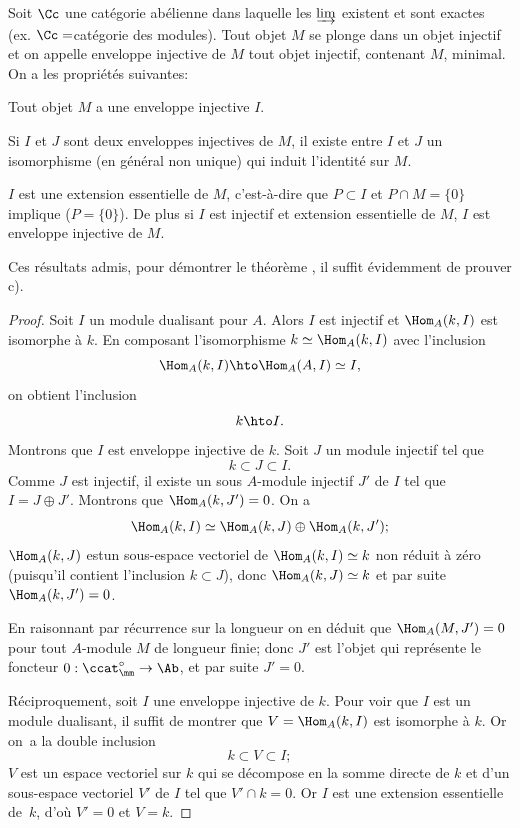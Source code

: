 Soit $\Cc$ une cat\'egorie ab\'elienne dans laquelle les $\varinjlim$ existent et sont exactes (ex. $\Cc=$cat\'egorie des modules). Tout objet $M$ se plonge dans un objet injectif et on appelle enveloppe injective de $M$ tout objet injectif, contenant $M$, minimal. On a les propri\'et\'es suivantes:
\begin{enumeratei}
\item
Tout objet $M$ a une enveloppe injective $I$.
\item
Si $I$ et $J$ sont deux enveloppes injectives de $M$, il existe entre $I$ et $J$ un isomorphisme (en g\'en\'eral non unique) qui induit l'identit\'e sur $M$.
\item
$I$ est une extension essentielle\label{pIV.13} de $M$, c'est-\`a-dire que $P\subset I$ et $P\cap M=\{ 0\}$ implique ($P=\{ 0\}$). De plus si $I$ est injectif et extension essentielle de $M$, $I$ est enveloppe injective de $M$.
\end{enumeratei}

Ces r\'esultats admis, pour d\'emontrer le th\'eor\`eme , il suffit \'evidemment de prouver c).

\begin{proof}
Soit $I$ un module dualisant pour $A$. Alors $I$ est injectif et $\Hom_{A}(k, I)$ est isomorphe \`a $k$. En composant l'isomorphisme $k\simeq \Hom_{A}(k, I)$ avec l'inclusion
$$
\Hom_{A}(k, I)\hto \Hom_{A}(A, I)\simeq I,
$$
on obtient l'inclusion
$$
k\hto I.
$$
Montrons que $I$ est enveloppe injective de $k$. Soit $J$ un module injectif tel que
$$
k\subset J\subset I.
$$
Comme $J$ est injectif, il existe un sous $A$-module injectif $J'$ de $I$ tel que $I=J\oplus J'$. Montrons que $\Hom_{A}(k, J')=0$. On a
$$
\Hom_{A}(k, I)\simeq \Hom_{A}(k, J)\oplus \Hom_{A}(k, J');
$$
$\Hom_{A}(k, J)$ est\pageoriginale un sous-espace vectoriel de $\Hom_{A}(k, I)\simeq k$ non r\'eduit \`a z\'ero (puisqu'il contient l'inclusion $k\subset J$), donc $\Hom_{A}(k, J)\simeq k$ et par suite $\Hom_{A}(k, J')=0$.

En raisonnant par r\'ecurrence sur la longueur on en d\'eduit que $\Hom_{A}(M, J')=0$ pour tout $A$-module $M$ de longueur finie; donc $J'$ est l'objet qui repr\'esente le foncteur $0:\ccat_{\mm}^{\circ}\to \Ab$, et par suite $J'=0$.

R\'eciproquement, soit $I$ une enveloppe injective de $k$. Pour voir que $I$ est un module dualisant, il suffit de montrer \ignorespaces que $V=\Hom_{A}(k, I)$ est isomorphe \`a $k$. Or on~a la double inclusion
$$
k\subset V\subset I;
$$
$V$ est un espace vectoriel sur $k$ qui se d\'ecompose en la somme directe de $k$ et d'un sous-espace vectoriel $V'$ de $I$ tel que $V'\cap k=0$. Or $I$ est une extension essentielle de~$k$, d'o\`u $V'=0$ et $V=k$.
\skipqed
\end{proof}

